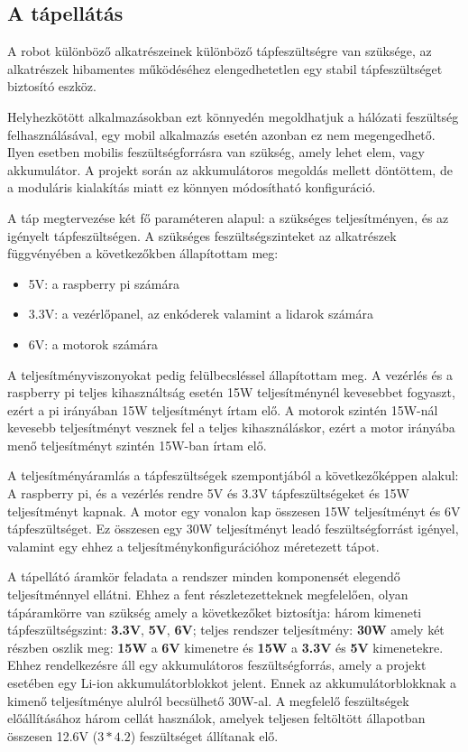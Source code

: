 
\subsection{A tápellátás}

A robot különböző alkatrészeinek különböző tápfeszültségre van szüksége, az
alkatrészek hibamentes működéséhez elengedhetetlen egy stabil tápfeszültséget
biztosító eszköz.

Helyhezkötött alkalmazásokban ezt könnyedén megoldhatjuk a hálózati feszültség
felhasználásával, egy mobil alkalmazás esetén azonban ez nem megengedhető. Ilyen
esetben mobilis feszültségforrásra van szükség, amely lehet elem, vagy
akkumulátor. A projekt során az akkumulátoros megoldás mellett döntöttem, de
a moduláris kialakítás miatt ez könnyen módosítható konfiguráció.

\medskip

A táp megtervezése két fő paraméteren alapul: a szükséges teljesítményen, és az
igényelt tápfeszültségen. A szükséges feszültségszinteket az alkatrészek
függvényében a következőkben állapítottam meg:

\begin{itemize}
\item 5V: a raspberry pi számára
\item 3.3V: a vezérlőpanel, az enkóderek valamint a lidarok számára
\item 6V: a motorok számára
\end{itemize}

A teljesítményviszonyokat pedig felülbecsléssel állapítottam meg. A vezérlés és
a raspberry pi teljes kihasználtság esetén 15W teljesítménynél kevesebbet
fogyaszt, ezért a pi irányában 15W teljesítményt írtam elő. A motorok szintén
15W-nál kevesebb teljesítményt vesznek fel a teljes kihasználáskor, ezért a motor
irányába menő teljesítményt szintén 15W-ban írtam elő.

A teljesítményáramlás a tápfeszültségek szempontjából a következőképpen alakul:
A raspberry pi, és a vezérlés rendre 5V és 3.3V tápfeszültségeket és 15W
teljesítményt kapnak. A motor egy vonalon kap összesen 15W teljesítményt és 6V
tápfeszültséget. Ez összesen egy 30W teljesítményt leadó feszültségforrást
igényel, valamint egy ehhez a teljesítménykonfigurációhoz méretezett tápot.

A tápellátó áramkör feladata a rendszer minden komponensét elegendő
teljesítménnyel ellátni. Ehhez a fent részletezetteknek megfelelően, olyan
tápáramkörre van szükség amely a következőket biztosítja: három kimeneti
tápfeszültségszint: \textbf{3.3V}, \textbf{5V}, \textbf{6V}; teljes rendszer
teljesítmény: \textbf{30W} amely két részben oszlik meg: \textbf{15W} a
\textbf{6V} kimenetre és \textbf{15W} a \textbf{3.3V} és \textbf{5V} kimenetekre.
Ehhez rendelkezésre áll egy akkumulátoros feszültségforrás, amely a projekt
esetében egy Li-ion akkumulátorblokkot jelent. Ennek az akkumulátorblokknak a
kimenő teljesítménye alulról becsülhető 30W-al. A megfelelő feszültségek
előállításához három cellát használok, amelyek teljesen feltöltött állapotban
összesen 12.6V (\(3 * 4.2\)) feszültséget állítanak elő.

